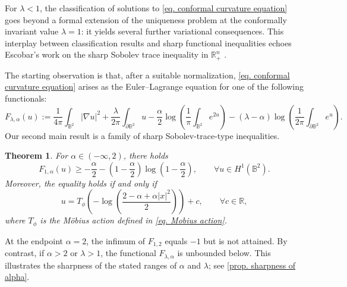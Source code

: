 \documentclass[11pt,a4paper,twoside]{amsart}
\newtheorem{theorem}{Theorem} [section]
\newtheorem{sketch proof}{Sketch of the proof}[section]
\begin{document}
For $\lambda<1$, the classification of solutions to \cref{eq. conformal curvature equation} goes beyond a formal extension of the uniqueness problem at the conformally invariant value $\lambda=1$:  it yields several further variational consequences.
This interplay between classification results and sharp functional inequalities echoes Escobar's work on the sharp Sobolev trace inequality in $\mathbb{R}_{+}^{n}$ \cite[Theorem 3.3]{Esc90}.

The starting observation is that, after a suitable normalization, \cref{eq. conformal curvature equation} arises as the Euler--Lagrange equation for one of the following functionals:
\begin{equation*}
        F_{\lambda,\alpha}(u)
        :=\frac{1}{4\pi}
        \int_{\mathbb{B}^2}|\nabla u|^2
        +\frac{\lambda}{2\pi}
        \int_{\partial \mathbb{B}^2}u
        -\frac{\alpha}{2}
        \log\left(
        \frac{1}{\pi}\int_{\mathbb{B}^2}e^{2u}
        \right)
        -(\lambda-\alpha)
        \log\left(
        \frac{1}{2\pi}
        \int_{\partial\mathbb{B}^2}e^{u}
        \right).
    \end{equation*}
    Our second main result is a family of sharp Sobolev-trace-type inequalities.
\begin{theorem}\label{thm. sharp Sobolev-trace inequality}
    For  $\alpha\in(-\infty,2)$, there holds
        \[
        F_{1,\alpha}(u)
        \geq -\frac{\alpha}{2}
        -\left(1-\frac{\alpha}{2}\right)
        \log\left(1-\frac{\alpha}{2}\right),\qquad 
        \forall u\in H^1(\mathbb{B}^2).
        \]
        Moreover, the equality holds if and only if
        \begin{equation*}
            u=T_{\phi}
            \left(
            -\log 
         \left(\frac{2-\alpha+\alpha|x|^2}{2}\right)
            \right)+c,\qquad \forall c\in\mathbb{R},
        \end{equation*}
        where  $T_\phi$ is the M\"obius action defined in \cref{eq. Mobius action}.
\end{theorem}
    At the endpoint $\alpha=2$, the infimum of $F_{1,2}$ equals $-1$ but is not attained. By contrast, if $\alpha>2$ or $\lambda>1$, the functional $F_{\lambda,\alpha}$ is unbounded below. This illustrates the sharpness of the stated ranges of $\alpha$ and $\lambda$; see \cref{prop. sharpness of alpha}.
\end{document}
